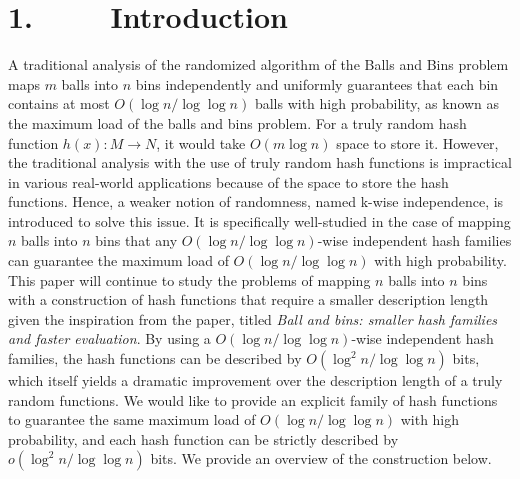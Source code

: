 \documentclass[a4paper, english]{paper}
\begin{document}
	\section{1. $\qquad$ Introduction}
	A traditional analysis of the randomized algorithm of the Balls and Bins problem maps $m$ balls into $n$ bins independently and uniformly guarantees that each bin contains at most $O(\log n/\log\log n)$ balls with high probability, as known as the maximum load of the balls and bins problem. For a truly random hash function $h(x): M \rightarrow N$, it would take $O(m\log n)$ space to store it. However, the traditional analysis with the use of truly random hash functions is impractical in various real-world applications because of the space to store the hash functions. Hence, a weaker notion of randomness, named k-wise independence, is introduced to solve this issue. It is specifically well-studied in the case of mapping $n$ balls into $n$ bins that any $O(\log n/\log\log n)$-wise independent hash families can guarantee the maximum load of $O(\log n/\log\log n)$ with high probability. \\
	\indent This paper will continue to study the problems of mapping $n$ balls into $n$ bins with a construction of hash functions that require a smaller description length given the inspiration from the paper, titled \textit{Ball and bins: smaller hash families and faster evaluation}. By using a $O(\log n/\log\log n)$-wise independent hash families, the hash functions can be described by $O(\log^2 n/\log\log n)$ bits, which itself yields a dramatic improvement over the description length of a truly random functions. We would like to provide an explicit family of hash functions to guarantee the same maximum load of $O(\log n/\log\log n)$ with high probability, and each hash function can be strictly described by $o(\log^2 n/\log\log n)$ bits. We provide an overview of the construction below.   \\
	
\end{document}
